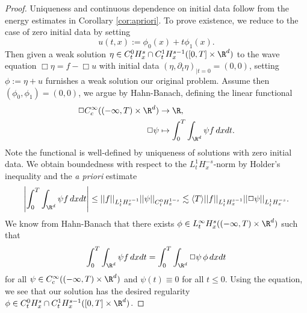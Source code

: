 \documentclass[reqno]{amsart}
\theoremstyle{definition}
\theoremstyle{remark}
\newcounter{problem}[section]	\declaretheorem[style=thmrecbox,name=Problem, numberlike=problem]{statement}
\begin{document}
\begin{proof}
	Uniqueness and continuous dependence on initial data follow from the energy estimates in Corollary \ref{cor:apriori}. To prove existence, we reduce to the case of zero initial data by setting
		\[
			u (t, x)
				:= \phi_0 (x) + t \phi_1 (x).
		\]			
	Then given a weak solution $\eta \in C^0_t H^s_x \cap C^1_t H^{s - 1}_x ([0, T] \times \R^d)$ to the wave equation $\Box \eta = f - \Box u$ with initial data $(\eta, \partial_t \eta)_{|t = 0} = (0,0)$, setting $\phi:= \eta + u$ furnishes a weak solution our original problem. Assume then $(\phi_0, \phi_1) = (0, 0)$, we argue by Hahn-Banach, defining the linear functional
		\begin{align*}
			\Box 
				C^\infty_c ((-\infty, T) \times \R^d)
				&\to \R,\\
			 \Box \psi 
			 	&\mapsto \int_0^T \int_{\R^d} \psi f \, dx dt.
		\end{align*}	 
	Note the functional is well-defined by uniqueness of solutions with zero initial data. We obtain boundedness with respect to the $L^1_t H^{-s}_x$-norm by Holder's inequality and the \textit{a priori} estimate
	\begin{align*}
		\left|\int_0^T \int_{\R^d} \psi f \, dx dt \right| \leq ||f||_{L^1_t H^{s - 1}_x} ||\psi||_{C^0_t H^{1 - s}_x} \lesssim \langle T \rangle ||f||_{L^1_t H^{s - 1}_x} || \Box \psi ||_{L^1_t H^{-s}_x}.
	\end{align*}	
	 We know from Hahn-Banach that there exists $\phi \in L^\infty_t H^s_x ((-\infty, T) \times \R^d)$ such that 
	 	\[  \int_0^T \int_{\R^d} \psi f \, dx dt = \int_0^T \int_{\R^d} \Box \psi \, \phi \, dx dt \]
	 for all $\psi \in C^\infty_c ((-\infty, T) \times \R^d)$ and $\psi (t) \equiv 0$ for all $t \leq 0$. Using the equation, we see that our solution has the desired regularity $\phi \in C^0_t H^s_x \cap C^1_t H^{s - 1}_x ([0, T] \times \R^d)$. 
\end{proof}
\end{document}
